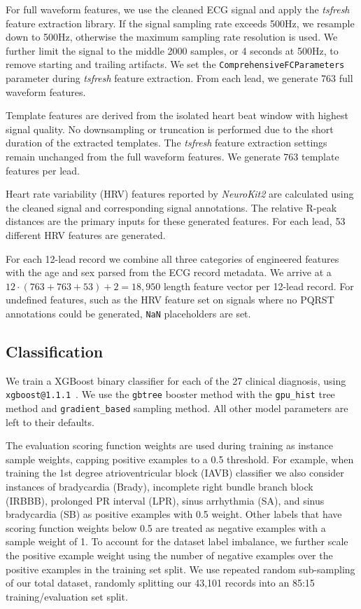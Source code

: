 \documentclass[twocolumn]{cinc}
\begin{document}
For full waveform features, we use the cleaned ECG signal and apply the \emph{tsfresh} feature extraction library.
If the signal sampling rate exceeds 500Hz, we resample down to 500Hz, otherwise the maximum sampling rate resolution is used.
We further limit the signal to the middle 2000 samples, or 4 seconds at 500Hz, to remove starting and trailing artifacts.
We set the \texttt{ComprehensiveFCParameters} parameter during \emph{tsfresh} feature extraction.
From each lead, we generate 763 full waveform features.

Template features are derived from the isolated heart beat window with highest signal quality.
No downsampling or truncation is performed due to the short duration of the extracted templates.
The \emph{tsfresh} feature extraction settings remain unchanged from the full waveform features.
We generate 763 template features per lead.

Heart rate variability (HRV) features reported by \emph{NeuroKit2} are calculated using the cleaned signal and corresponding signal annotations.
The relative R-peak distances are the primary inputs for these generated features.
For each lead, 53 different HRV features are generated.

For each 12-lead record we combine all three categories of engineered features with the age and sex parsed from the ECG record metadata.
We arrive at a $12 \cdot (763 + 763 + 53) + 2 = 18,950$ length feature vector per 12-lead record.
For undefined features, such as the HRV feature set on signals where no PQRST annotations could be generated, \texttt{NaN} placeholders are set.

\subsection{Classification}

We train a XGBoost binary classifier for each of the 27 clinical diagnosis, using \texttt{xgboost@1.1.1}~\cite{chen_xgboost_2016}.
We use the \texttt{gbtree} booster method with the \texttt{gpu\_hist} tree method and \texttt{gradient\_based} sampling method.
All other model parameters are left to their defaults.

The evaluation scoring function weights are used during training as instance sample weights, capping positive examples to a 0.5 threshold.
For example, when training the 1st degree atrioventricular block (IAVB) classifier we also consider instances of bradycardia (Brady), incomplete right bundle branch block (IRBBB), prolonged PR interval (LPR), sinus arrhythmia (SA), and sinus bradycardia (SB) as positive examples with 0.5 weight.
Other labels that have scoring function weights below 0.5 are treated as negative examples with a sample weight of 1.
To account for the dataset label imbalance, we further scale the positive example weight using the number of negative examples over the positive examples in the training set split.
We use repeated random sub-sampling of our total dataset, randomly splitting our 43,101 records into an 85:15 training/evaluation set split.
\end{document}
